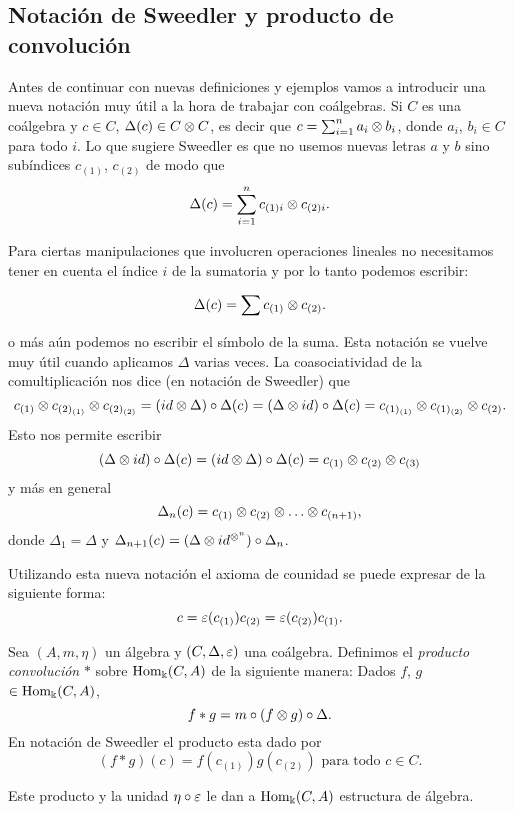 \documentclass[a4paper,oneside,fleqn,11pt,../tesis.tex]{subfiles}
\begin{document}
\subsection{Notación de Sweedler y producto de convolución}
Antes de continuar con nuevas definiciones y ejemplos vamos a introducir una nueva notación muy útil a la hora
de trabajar con coálgebras. Si $C$ es una coálgebra y $c \in C$, $\Delta(c) \in C \otimes C$, es decir que
$c = \sum_{i = 1}^n a_i \otimes b_i$, donde $a_i$, $b_i \in C$ para todo $i$. Lo que sugiere Sweedler es que no usemos nuevas
letras $a$ y $b$ sino subíndices $c_{(1)}$, $c_{(2)}$ de modo que
\[
	\Delta(c) = \sum_{i = 1}^n c_{(1)i} \otimes c_{(2)i}.
\]

Para ciertas manipulaciones que involucren operaciones lineales no necesitamos tener en cuenta el índice $i$ de la
sumatoria y por lo tanto podemos escribir:

\[
	\Delta(c) = \sum c_{(1)} \otimes c_{(2)}.
\]

o más aún podemos no escribir el símbolo de la suma. Esta notación se vuelve muy útil cuando aplicamos $\Delta$
varias veces. La coasociatividad de la comultiplicación nos dice (en notación de Sweedler) que
\[
	c_{(1)} \otimes c_{(2)_{(1)}} \otimes c_{(2)_{(2)}} = (id \otimes \Delta) \circ \Delta (c)
	= (\Delta \otimes id) \circ \Delta(c) = c_{(1)_{(1)}} \otimes c_{(1)_{(2)}} \otimes c_{(2)}.
\]
Esto nos permite escribir
\[
	(\Delta \otimes id) \circ \Delta (c) = (id \otimes \Delta) \circ \Delta(c) = c_{(1)} \otimes c_{(2)} \otimes c_{(3)}
\]
y más en general
\[
	\Delta_n(c) = c_{(1)} \otimes c_{(2)} \otimes \ldots \otimes c_{(n + 1)},
\]
donde $\Delta_1 = \Delta$ y $\Delta_{n + 1}(c) = (\Delta \otimes id^{\otimes^n}) \circ \Delta_{n}$.

Utilizando esta nueva notación el axioma de counidad se puede expresar de la siguiente forma:
\[
	c = \varepsilon(c_{(1)}) c_{(2)} = \varepsilon(c_{(2)}) c_{(1)}.
\]

\begin{definition}
	Sea $\left(A, m, \eta \right)$ un álgebra y $\left(C, \Delta, \varepsilon \right)$ una coálgebra. Definimos el
	\emph{producto convolución} $\ast$ sobre $\operatorname{Hom}_{\Bbbk}(C, A)$ de la siguiente manera: Dados $f$, $g$ $\in \operatorname{Hom}_{\Bbbk}(C, A)$,
	\[
		f \ast g = m \circ (f \otimes g) \circ \Delta. 	
	\]
	En notación de Sweedler el producto esta dado por
	\[
		(f \ast g)(c) = f(c_{(1)})g(c_{(2)}) \text{ para todo } c \in C.
	\]
\end{definition}

Este producto y la unidad $\eta \circ \varepsilon$ le dan a $\operatorname{Hom}_{\Bbbk}(C, A)$ estructura de álgebra.
\end{document}
